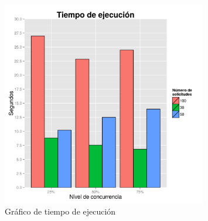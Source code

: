 \begin{figure}[!ht]
	\begin{center}
		\includegraphics[width=0.8\textwidth]{../graphics/gra_te.png}
		\caption{Gráfico de tiempo de ejecución}
		\label{fig:gra_te}
	\end{center}
\end{figure}

\newpage
